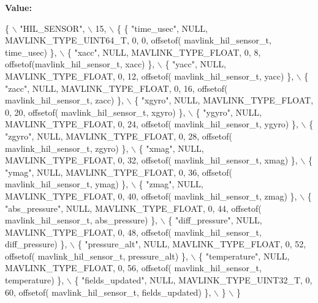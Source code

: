 {\bfseries Value\+:}
\begin{DoxyCode}
\{ \(\backslash\)
    \textcolor{stringliteral}{"HIL\_SENSOR"}, \(\backslash\)
    15, \(\backslash\)
    \{  \{ \textcolor{stringliteral}{"time\_usec"}, NULL, MAVLINK_TYPE_UINT64_T, 0, 0, offsetof(
      mavlink_hil_sensor_t, time\_usec) \}, \(\backslash\)
         \{ \textcolor{stringliteral}{"xacc"}, NULL, MAVLINK_TYPE_FLOAT, 0, 8, offsetof(mavlink_hil_sensor_t, xacc) \}, \(\backslash\)
         \{ \textcolor{stringliteral}{"yacc"}, NULL, MAVLINK_TYPE_FLOAT, 0, 12, offsetof(
      mavlink_hil_sensor_t, yacc) \}, \(\backslash\)
         \{ \textcolor{stringliteral}{"zacc"}, NULL, MAVLINK_TYPE_FLOAT, 0, 16, offsetof(
      mavlink_hil_sensor_t, zacc) \}, \(\backslash\)
         \{ \textcolor{stringliteral}{"xgyro"}, NULL, MAVLINK_TYPE_FLOAT, 0, 20, offsetof(
      mavlink_hil_sensor_t, xgyro) \}, \(\backslash\)
         \{ \textcolor{stringliteral}{"ygyro"}, NULL, MAVLINK_TYPE_FLOAT, 0, 24, offsetof(
      mavlink_hil_sensor_t, ygyro) \}, \(\backslash\)
         \{ \textcolor{stringliteral}{"zgyro"}, NULL, MAVLINK_TYPE_FLOAT, 0, 28, offsetof(
      mavlink_hil_sensor_t, zgyro) \}, \(\backslash\)
         \{ \textcolor{stringliteral}{"xmag"}, NULL, MAVLINK_TYPE_FLOAT, 0, 32, offsetof(
      mavlink_hil_sensor_t, xmag) \}, \(\backslash\)
         \{ \textcolor{stringliteral}{"ymag"}, NULL, MAVLINK_TYPE_FLOAT, 0, 36, offsetof(
      mavlink_hil_sensor_t, ymag) \}, \(\backslash\)
         \{ \textcolor{stringliteral}{"zmag"}, NULL, MAVLINK_TYPE_FLOAT, 0, 40, offsetof(
      mavlink_hil_sensor_t, zmag) \}, \(\backslash\)
         \{ \textcolor{stringliteral}{"abs\_pressure"}, NULL, MAVLINK_TYPE_FLOAT, 0, 44, offsetof(
      mavlink_hil_sensor_t, abs\_pressure) \}, \(\backslash\)
         \{ \textcolor{stringliteral}{"diff\_pressure"}, NULL, MAVLINK_TYPE_FLOAT, 0, 48, offsetof(
      mavlink_hil_sensor_t, diff\_pressure) \}, \(\backslash\)
         \{ \textcolor{stringliteral}{"pressure\_alt"}, NULL, MAVLINK_TYPE_FLOAT, 0, 52, offsetof(
      mavlink_hil_sensor_t, pressure\_alt) \}, \(\backslash\)
         \{ \textcolor{stringliteral}{"temperature"}, NULL, MAVLINK_TYPE_FLOAT, 0, 56, offsetof(
      mavlink_hil_sensor_t, temperature) \}, \(\backslash\)
         \{ \textcolor{stringliteral}{"fields\_updated"}, NULL, MAVLINK_TYPE_UINT32_T, 0, 60, offsetof(
      mavlink_hil_sensor_t, fields\_updated) \}, \(\backslash\)
         \} \(\backslash\)
\}
\end{DoxyCode}
\mbox{\label{mavlink__msg__hil__sensor_8h_aff90ddc79c47b70962b028f102690448}} 
